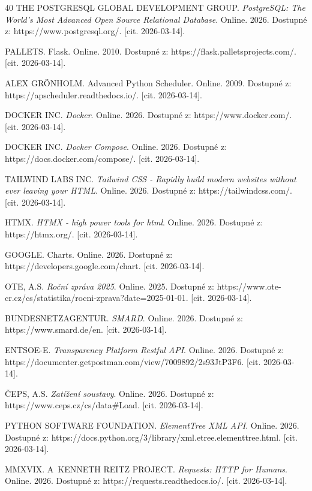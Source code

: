 \documentclass[a4paper]{article}
\begin{document}
\begin{thebibliography}{40}
 THE POSTGRESQL GLOBAL DEVELOPMENT GROUP. \textit{PostgreSQL: The World's Most Advanced Open Source Relational Database}. Online. 2026. Dostupné z: https://www.postgresql.org/. [cit. 2026-03-14].

 PALLETS. Flask. Online. 2010. Dostupné z: https://flask.palletsprojects.com/. [cit. 2026-03-14]. 

 ALEX GRÖNHOLM. Advanced Python Scheduler. Online. 2009. Dostupné z: https://apscheduler.readthedocs.io/. [cit. 2026-03-14]. 

 DOCKER INC. \textit{Docker}. Online. 2026. Dostupné z: https://www.docker.com/. [cit. 2026-03-14].

 DOCKER INC. \textit{Docker Compose}. Online. 2026. Dostupné z: https://docs.docker.com/compose/. [cit. 2026-03-14].

 TAILWIND LABS INC. \textit{Tailwind CSS - Rapidly build modern websites without ever leaving your HTML}. Online. 2026. Dostupné z: https://tailwindcss.com/. [cit. 2026-03-14].

 HTMX. \textit{HTMX - high power tools for html}. Online. 2026. Dostupné z: https://htmx.org/. [cit. 2026-03-14].

 GOOGLE. Charts. Online. 2026. Dostupné z: https://developers.google.com/chart. [cit. 2026-03-14].

 OTE, A.S. \textit{Roční zpráva 2025}. Online. 2025. Dostupné z: https://www.ote-cr.cz/cs/statistika/rocni-zprava?date=2025-01-01. [cit. 2026-03-14]. 

 BUNDESNETZAGENTUR. \textit{SMARD}. Online. 2026. Dostupné z: https://www.smard.de/en. [cit. 2026-03-14].

 ENTSOE-E. \textit{Transparency Platform Restful API}. Online. 2026. Dostupné z: https://documenter.getpostman.com/view/7009892/2s93JtP3F6. [cit. 2026-03-14].

 ČEPS, A.S. \textit{Zatížení soustavy}. Online. 2026. Dostupné z: https://www.ceps.cz/cs/data\#Load. [cit. 2026-03-14].

 PYTHON SOFTWARE FOUNDATION. \textit{ElementTree XML API}. Online. 2026. Dostupné z: https://docs.python.org/3/library/xml.etree.elementtree.html. [cit. 2026-03-14].

 MMXVIX. A~KENNETH REITZ PROJECT. \textit{Requests: HTTP for Humans}. Online. 2026. Dostupné z: https://requests.readthedocs.io/. [cit. 2026-03-14].


\end{thebibliography}
\end{document}
